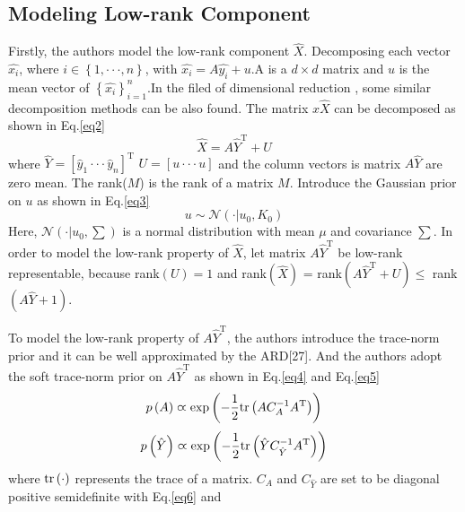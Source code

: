 \documentclass[10pt,twocolumn,letterpaper]{article}
\begin{document}
\subsection{Modeling Low-rank Component}
Firstly, the authors model the low-rank component $\hat{X}$. Decomposing 
each vector $\hat{x_i}$, where $i\in\left\lbrace 1,\cdot\cdot\cdot,n\right\rbrace$, 
with $\hat{x_i}=A\hat{y_i}+u$.A is a $d\times d$ matrix and $u$ is 
the mean vector of ${\left\lbrace \hat{x_i}\right\rbrace}_{i=1}^n$.In 
the filed of dimensional reduction \cite{nasrabadi2007pattern}, some similar decomposition 
methods can be also found. The matrix $x\hat{X}$ can be decomposed as
shown in Eq.\ref{eq2}
\begin{equation}
\hat{X} = A\hat{Y}^\mathrm{T}+U
\label{eq2}
\end{equation}
where $\hat{Y}=\left[\hat{y}_1\cdot\cdot\cdot\hat{y}_n\right]^\mathrm{T}$ 
$U=\left[u\cdot\cdot\cdot u\right]$ and the column vectors is matrix 
$A\hat{Y}$ are zero mean. The rank($M$) is the rank of a matrix $M$.
Introduce the Gaussian prior on $u$ as shown in Eq.\ref{eq3}
\begin{equation}
u \sim \mathcal{N}\left(\cdot|u_0,K_0\right)
\label{eq3}
\end{equation}
Here, $\mathcal{N}\left(\cdot|u_0,\sum \right)$ is a normal 
distribution with mean $\mu$ and covariance $\sum$. In
order to model the low-rank property of $\hat{X}$, let 
matrix $A\hat{Y}^\mathrm{T}$ be low-rank representable, 
because rank$\left(U\right)=1$ and rank$\left(\hat{X}\right)$ = 
rank$\left(A\hat{Y}^\mathrm{T}+U\right) \leq$ rank $\left(A\hat{Y}+1\right)$.
\par
To model the low-rank property of $A\hat{Y}^\mathrm{T}$, the authors
introduce the trace-norm prior \cite{candes2011robust,candes2009exact}and it can be well approximated 
by the ARD[27]. And the authors adopt the soft trace-norm prior on 
$A\hat{Y}^\mathrm{T}$ as shown in Eq.\ref{eq4} and Eq.\ref{eq5}
\begin{equation}
p\left(A\right) \varpropto {\rm exp}\left(-\frac{1}{2}{\rm tr}\left(AC_A^{-1}A^\mathrm{T}\right)\right)
\label{eq4}
\end{equation}
\begin{equation}
p\left(\hat{Y}\right) \varpropto {\rm exp}\left(-\frac{1}{2}{\rm tr}\left(\hat{Y}C_{\hat{Y}}^{-1}A^\mathrm{T}\right)\right)
\label{eq5}
\end{equation}
where ${\rm tr}\left(\cdot\right)$ represents the trace of a matrix. $C_A$ and $C_{\hat{Y}}$ are set to be diagonal positive semidefinite with Eq.\ref{eq6} and 
\end{document}
